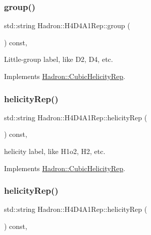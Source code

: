 \subsubsection{\texorpdfstring{group()}{group()}\hspace{0.1cm}{\footnotesize\ttfamily [5/5]}}
{\footnotesize\ttfamily std\+::string Hadron\+::\+H4\+D4\+A1\+Rep\+::group (\begin{DoxyParamCaption}{ }\end{DoxyParamCaption}) const\hspace{0.3cm}{\ttfamily [inline]}, {\ttfamily [virtual]}}

Little-\/group label, like D2, D4, etc. 

Implements \mbox{\hyperlink{structHadron_1_1CubicHelicityRep_a101a7d76cd8ccdad0f272db44b766113}{Hadron\+::\+Cubic\+Helicity\+Rep}}.

\mbox{\label{structHadron_1_1H4D4A1Rep_a8ac76b2d5ec00ea18a04b62a2a5d20bb}} 
\subsubsection{\texorpdfstring{helicityRep()}{helicityRep()}\hspace{0.1cm}{\footnotesize\ttfamily [1/3]}}
{\footnotesize\ttfamily std\+::string Hadron\+::\+H4\+D4\+A1\+Rep\+::helicity\+Rep (\begin{DoxyParamCaption}{ }\end{DoxyParamCaption}) const\hspace{0.3cm}{\ttfamily [inline]}, {\ttfamily [virtual]}}

helicity label, like H1o2, H2, etc. 

Implements \mbox{\hyperlink{structHadron_1_1CubicHelicityRep_af1096946b7470edf0a55451cc662f231}{Hadron\+::\+Cubic\+Helicity\+Rep}}.

\mbox{\label{structHadron_1_1H4D4A1Rep_a8ac76b2d5ec00ea18a04b62a2a5d20bb}} 
\subsubsection{\texorpdfstring{helicityRep()}{helicityRep()}\hspace{0.1cm}{\footnotesize\ttfamily [2/3]}}
{\footnotesize\ttfamily std\+::string Hadron\+::\+H4\+D4\+A1\+Rep\+::helicity\+Rep (\begin{DoxyParamCaption}{ }\end{DoxyParamCaption}) const\hspace{0.3cm}{\ttfamily [inline]}, {\ttfamily [virtual]}}

